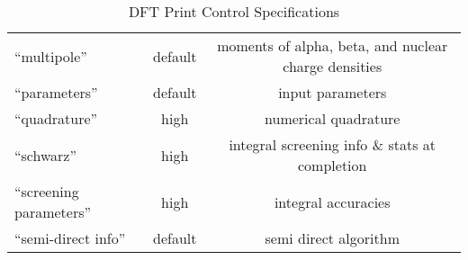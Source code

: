 \begin{table}[htbp]
\begin{center}
\begin{tabular}{lcc}
 ``multipole''                      & default     & moments of alpha, beta, and nuclear charge densities \\
 ``parameters''                     & default     & input parameters \\
 ``quadrature''                     & high        & numerical quadrature  \\
 ``schwarz''                        & high        & integral screening info \& stats at completion\\
 ``screening parameters''           & high        & integral accuracies \\
 ``semi-direct info''               & default     & semi direct algorithm \\
\end{tabular}
\end{center}
\caption{DFT Print Control Specifications}
\end{table}




